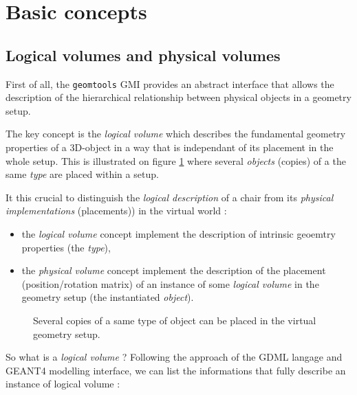 
\section{Basic concepts}

\subsection{Logical volumes and physical volumes}

\pn  First of  all, the  \texttt{geomtools} GMI  provides  an abstract
interface that allows the description of the hierarchical relationship
between physical objects in a geometry setup.

\pn The key  concept is the \emph{logical volume}  which describes the
fundamental  geometry properties  of  a  3D-object in  a  way that  is
independant of its  placement in the whole setup.  This is illustrated
on figure  \ref{fig:lv:0} where  several \emph{objects} (copies)  of a
the same \emph{type} are placed within a setup.

It  this crucial to  distinguish the  \emph{logical description}  of a
chair  from its \emph{physical  implementations} (placements))  in the
  virtual world :
  \begin{itemize}

  \item the \emph{logical volume} concept implement the description of
    intrinsic geoemtry properties (the \emph{type}),

  \item the  \emph{physical volume} concept  implement the description
    of the placement (position/rotation matrix) of an instance of some
    \emph{logical  volume}  in the  geometry  setup (the  instantiated
    \emph{object}).

  \end{itemize}

\begin{figure}[h]
\begin{center}
\scalebox{0.75}{}
\end{center}
\caption{Several copies of a same type of object can be placed in the virtual 
geometry setup.}\label{fig:lv:0}
\end{figure}

So what is a \emph{logical  volume} ? Following the approach of the GDML langage
and GEANT4 modelling interface, we can list the informations that fully describe
an instance of logical volume :

